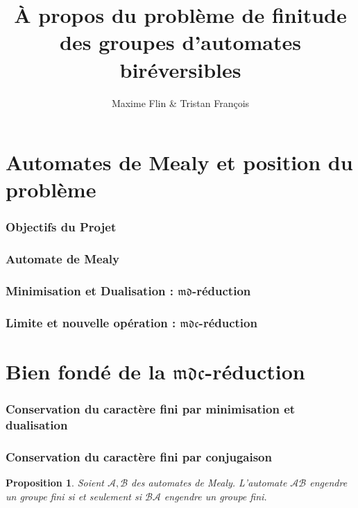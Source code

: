\documentclass[11pt]{beamer}
\newtheorem{prop}{Proposition}
\begin{document}
	\author{Maxime Flin  \& Tristan François}
	\title{\`A propos du problème de finitude des groupes d'automates biréversibles}
	\begin{frame}[plain]
		\maketitle
	\end{frame}
	
	\section{Automates de Mealy et position du problème}
	
	\begin{frame}
		\frametitle{Objectifs du Projet}
	\end{frame}

	\begin{frame}
		\frametitle{Automate de Mealy}
	\end{frame}

	\begin{frame}
		\frametitle{Minimisation et Dualisation : $\mathfrak{md}$-réduction}
	\end{frame}

	\begin{frame}
		\frametitle{Limite et nouvelle opération : $\mathfrak{mdc}$-réduction}
	\end{frame}

	\section{Bien fondé de la $\mathfrak{mdc}$-réduction}
	
	\begin{frame}
		\frametitle{Conservation du caractère fini par minimisation et dualisation}
	\end{frame}
	
	\begin{frame}
		\frametitle{Conservation du caractère fini par conjugaison}
		
		\begin{prop} %
			Soient $\mathcal{A}, \mathcal{B}$ des automates de Mealy.
			L'automate $\mathcal{A}\mathcal{B}$ engendre un groupe fini si et seulement si $\mathcal{B}\mathcal{A}$ engendre un groupe fini.
		\end{prop}
	\end{frame}
\end{document}
